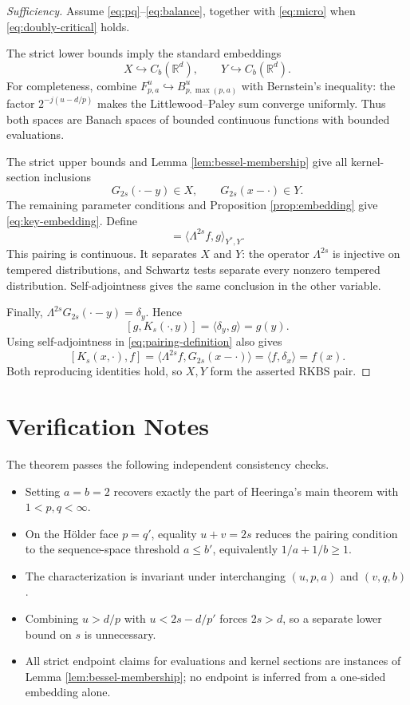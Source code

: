 \documentclass[11pt]{article}
\newcommand{\R}{\mathbb R}
\newcommand{\Fsp}[3]{F^{#1}_{#2,#3}}
\newcommand{\Bsp}[3]{B^{#1}_{#2,#3}}
\newcommand{\Lambdaop}{\Lambda}
\newcommand{\ip}[2]{\langle #1,#2\rangle}
\begin{document}
\begin{proof}[Sufficiency]
Assume \eqref{eq:pq}--\eqref{eq:balance}, together with
\eqref{eq:micro} when \eqref{eq:doubly-critical} holds.

The strict lower bounds imply the standard embeddings
\[
  X\hookrightarrow C_b(\R^d),
  \qquad Y\hookrightarrow C_b(\R^d).
\]
For completeness, combine
$\Fsp{u}{p}{a}\hookrightarrow\Bsp{u}{p}{\max(p,a)}$ with Bernstein's
inequality: the factor $2^{-j(u-d/p)}$ makes the Littlewood--Paley sum
converge uniformly.  Thus both spaces are Banach spaces of bounded
continuous functions with bounded evaluations.

The strict upper bounds and Lemma \ref{lem:bessel-membership} give all
kernel-section inclusions
\[
  G_{2s}(\cdot-y)\in X,
  \qquad G_{2s}(x-\cdot)\in Y.
\]
The remaining parameter conditions and Proposition
\ref{prop:embedding} give \eqref{eq:key-embedding}.  Define
\begin{equation}
  [g,f]=\ip{\Lambdaop^{2s}f}{g}_{Y^*,Y}.
  \label{eq:pairing-definition}
\end{equation}
This pairing is continuous.  It separates $X$ and $Y$: the operator
$\Lambdaop^{2s}$ is injective on tempered distributions, and Schwartz
tests separate every nonzero tempered distribution.  Self-adjointness gives
the same conclusion in the other variable.

Finally,
$\Lambdaop^{2s}G_{2s}(\cdot-y)=\delta_y$.  Hence
\[
  [g,K_s(\cdot,y)]=\ip{\delta_y}{g}=g(y).
\]
Using self-adjointness in \eqref{eq:pairing-definition} also gives
\[
  [K_s(x,\cdot),f]
  =\ip{\Lambdaop^{2s}f}{G_{2s}(x-\cdot)}
  =\ip{f}{\delta_x}=f(x).
\]
Both reproducing identities hold, so $X,Y$ form the asserted RKBS pair.
\end{proof}

\section*{Verification Notes}

The theorem passes the following independent consistency checks.
\begin{itemize}
  \item Setting $a=b=2$ recovers exactly the part of Heeringa's main
  theorem with $1<p,q<\infty$.
  \item On the H\"older face $p=q'$, equality $u+v=2s$ reduces the
  pairing condition to the sequence-space threshold
  $a\leq b'$, equivalently $1/a+1/b\geq1$.
  \item The characterization is invariant under interchanging
  $(u,p,a)$ and $(v,q,b)$.
  \item Combining $u>d/p$ with $u<2s-d/p'$ forces $2s>d$, so a
  separate lower bound on $s$ is unnecessary.
  \item All strict endpoint claims for evaluations and kernel sections are
  instances of Lemma \ref{lem:bessel-membership}; no endpoint is inferred
  from a one-sided embedding alone.
\end{itemize}
\end{document}
